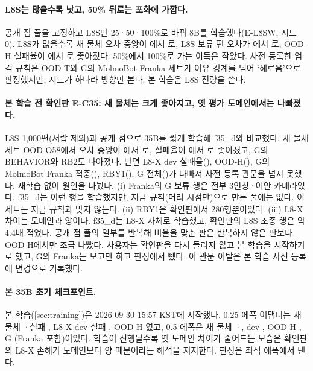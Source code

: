 \paragraph{L8S는 많을수록 낫고, 50\% 뒤로는 포화에 가깝다.} 공개 점 풀을 고정하고 L8S만 25·50·100\%로 바꿔 8B를 학습했다(E-L8SW, 시드 0). L8S가 많을수록 새 물체 오차 중앙이 에서 로, L8S 보류 편 오차가 에서 로, OOD-H 실패율이 에서 로 좋아졌다. 50\%에서 100\%로 가는 이득은 작았다. 사전 등록한 엄격 규칙은 OOD-T와 G의 MolmoBot Franka 세트가 여유 경계를 넘어 `해로움'으로 판정했지만, 시드가 하나라 방향만 본다. 본 학습은 L8S 전량을 쓴다.

\paragraph{본 학습 전 확인판 E-C35: 새 물체는 크게 좋아지고, 옛 평가 도메인에서는 나빠졌다.} L8S 1,000편(서랍 제외)과 공개 점으로 35B를 짧게 학습해 f35\_d와 비교했다. 새 물체 세트 OOD-O58에서 오차 중앙이 에서 로, 실패율이 에서 로 좋아졌고, G의 BEHAVIOR와 RB2도 나아졌다. 반면 L8-X dev 실패율(), OOD-H(), G의 MolmoBot Franka 적중(), RBY1(), G 전체()가 나빠져 사전 등록 관문을 넘지 못했다. 재학습 없이 원인을 나눴다. (i) Franka의 G 보류 행은 전부 3인칭·어안 카메라였다. f35\_d는 이런 행을 학습했지만, 지금 규칙(머리 시점만)으로 만든 풀에는 없다. 이 세트는 지금 규칙과 맞지 않는다. (ii) RBY1은 확인판에서 280행뿐이었다. (iii) L8-X 차이는 도메인과 양이다. f35\_d는 L8-X 자체로 학습했고, 확인판의 L8S 조종 행은 약 4.4배 적었다. 공개 점 풀의 일부를 반복해 비율을 맞춘 판은 반복하지 않은 판보다 OOD-H에서만 조금 나빴다. 사용자는 확인판을 다시 돌리지 않고 본 학습을 시작하기로 했고, G의 Franka는 보고만 하고 판정에서 뺐다. 이 관문 이탈은 본 학습 사전 등록에 변경으로 기록했다.

\paragraph{본 35B 초기 체크포인트.} 본 학습(\cref{sec:training})은 2026-09-30 15:57 KST에 시작했다. 0.25 에폭 어댑터는 새 물체 ·실패 , L8-X dev 실패 , OOD-H 였고, 0.5 에폭은 새 물체 ·, dev , OOD-H , G (Franka 포함)이었다. 학습이 진행될수록 옛 도메인 차이가 줄어드는 모습은 확인판의 L8-X 손해가 도메인보다 양 때문이라는 해석을 지지한다. 판정은 최적 에폭에서 낸다.

